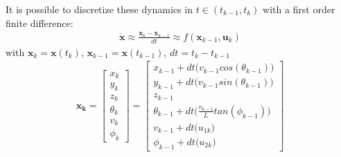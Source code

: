 It is possible to discretize these dynamics in $t \in (t_{k-1}, t_k)$ with a first order finite difference:
\begin{align}
\boldsymbol{\dot{x}} \approx \frac{\boldsymbol{x}_k - \boldsymbol{x}_{k-1} }{dt} \approx f(\boldsymbol{x}_{k-1},\boldsymbol{u}_k) \nonumber
\end{align}
with $\boldsymbol{x}_k = \boldsymbol{x}(t_k)$, $\boldsymbol{x}_{k-1} = \boldsymbol{x}(t_{k-1})$, $dt = t_k - t_{k-1}$
\begin{align}
\boldsymbol{x_k} = 
\begin{bmatrix}
x_k  \\[10pt]
y_k  \\[10pt]
z_k \\[10pt]
\theta_k \\[10pt]
v_k  \\[10pt]
\phi_k
\end{bmatrix}
= 
\begin{bmatrix}
 x_{k-1} + dt \big(v_{k-1} cos(\theta_{k-1})\big) \\[10pt]
 y_{k-1} + dt \big(v_{k-1} sin(\theta_{k-1})\big) \\[10pt]
 z_{k-1} \\[10pt]
 \theta_{k-1} + dt\Big(\frac{v_{k-1}}{L}tan(\phi_{k-1}) \Big)\\[10pt]
v_{k-1} + dt \big(u_{1k}\big) \\[10pt]
\phi_{k-1} + dt \big(u_{2k}\big) 
\end{bmatrix}
\label{eq:realstate}
\end{align}

